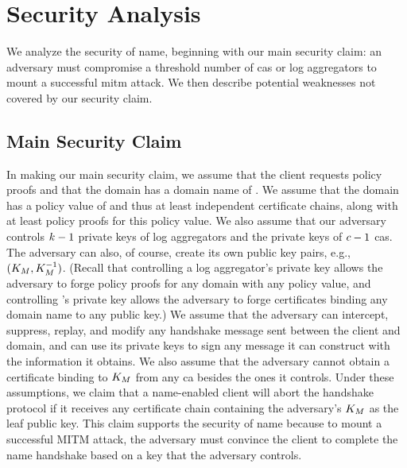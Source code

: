 \section{Security Analysis}
\label{sec:analysis}

We analyze the security of \ac{name}, beginning with
our main security claim: an adversary must compromise a threshold number
of \acp{ca} or log aggregators to mount a successful \ac{mitm} attack.
We then describe potential weaknesses not covered by our security claim.

\subsection{Main Security Claim}
\label{sec:analysis:informal}

In making our main security claim, we assume that the client requests \numlas
policy proofs and that the domain has a domain name of \domain. We assume that
the domain has a policy value of \policy and thus at least \policy independent
certificate chains, along with at least \numlas policy proofs for this policy
value. We also assume that our adversary controls $k - 1$ private keys of
log aggregators and the private keys of $c - 1$ \acp{ca}. The adversary
can also, of course, create its own public key pairs, e.g., $(K_M,
K_M^{-1})$. (Recall that controlling a log aggregator's private key
allows the adversary to forge policy proofs for any domain with any policy
value, and controlling 's private key allows the adversary to forge
certificates binding any domain name to any public key.) We assume that the
adversary can intercept, suppress, replay, and modify any handshake message sent
between the client and domain, and can use its private keys to sign any message
it can construct with the information it obtains. We also assume that the
adversary cannot obtain a certificate binding \domain to $K_M$ from
any \ac{ca} besides the ones it controls. Under these assumptions, we claim that
a \ac{name}-enabled client will abort the handshake protocol if it receives any
certificate chain containing the adversary's $K_M$ as the leaf public
key. This claim supports the security of \ac{name} because to mount a successful
MITM attack, the adversary must convince the client to complete the \ac{name}
handshake based on a key that the adversary controls.

